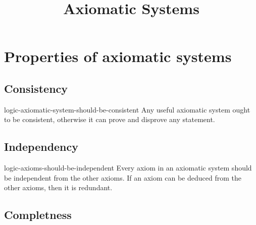 \documentclass[preview]{standalone}
\begin{document}
\title{Axiomatic Systems}
\genpage

\section{Properties of axiomatic systems}

\subsection{Consistency}


\begin{snippet}{logic-axiomatic-system-should-be-consistent}
Any useful axiomatic system ought to be consistent, otherwise it can prove and disprove any statement.
\end{snippet}

\subsection{Independency}


\begin{snippet}{logic-axioms-should-be-independent}
Every axiom in an axiomatic system should be independent from the other axioms.
If an axiom can be deduced from the other axioms, then it is redundant.
\end{snippet}

\subsection{Completness}

\end{document}
